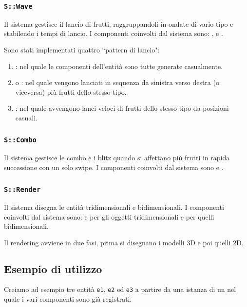 \subsubsection{\texttt{S::Wave}}
Il sistema  gestisce il lancio di frutti, raggruppandoli in ondate di vario tipo e stabilendo i tempi di lancio. I componenti coinvolti dal sistema sono: ,  e .

Sono stati implementati quattro ``pattern di lancio":
\begin{enumerate}
\item {}: nel quale le componenti dell'entità sono tutte generate casualmente.
\item {} o : nel quale vengono lanciati in sequenza da sinistra verso destra (o viceversa) più frutti dello stesso tipo.
\item {}: nel quale avvengono lanci veloci di frutti dello stesso tipo da posizioni casuali.
\end{enumerate}

\subsubsection{\texttt{S::Combo}}
Il sistema  gestisce le combo e i blitz quando si affettano più frutti in rapida successione con un solo swipe.
I componenti coinvolti dal sistema sono  e .


\subsubsection{\texttt{S::Render}}
Il sistema  disegna le entità tridimensionali e bidimensionali.
I componenti coinvolti dal sistema sono:  e  per gli oggetti tridimensionali e  per quelli bidimensionali.

Il rendering avviene in due fasi, prima si disegnano i modelli 3D e poi quelli 2D.




\subsection{Esempio di utilizzo}
\label{ssec:example-ecs}
Creiamo ad esempio tre entità \texttt{e1}, \texttt{e2} ed \texttt{e3} a partire da una istanza di un  nel quale i vari componenti sono già registrati.

